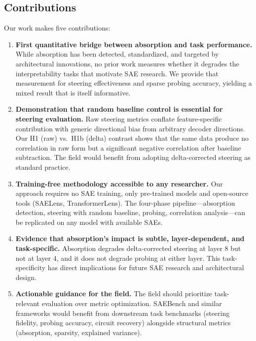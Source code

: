 \documentclass{article}
\begin{document}
\subsection{Contributions}

Our work makes five contributions:

\begin{enumerate}
    \item \textbf{First quantitative bridge between absorption and task performance.} While absorption has been detected, standardized, and targeted by architectural innovations, no prior work measures whether it degrades the interpretability tasks that motivate SAE research. We provide that measurement for steering effectiveness and sparse probing accuracy, yielding a mixed result that is itself informative.

    \item \textbf{Demonstration that random baseline control is essential for steering evaluation.} Raw steering metrics conflate feature-specific contribution with generic directional bias from arbitrary decoder directions. Our H1 (raw) vs.~H1b (delta) contrast shows that the same data produce no correlation in raw form but a significant negative correlation after baseline subtraction. The field would benefit from adopting delta-corrected steering as standard practice.

    \item \textbf{Training-free methodology accessible to any researcher.} Our approach requires no SAE training, only pre-trained models and open-source tools (SAELens, TransformerLens). The four-phase pipeline---absorption detection, steering with random baseline, probing, correlation analysis---can be replicated on any model with available SAEs.

    \item \textbf{Evidence that absorption's impact is subtle, layer-dependent, and task-specific.} Absorption degrades delta-corrected steering at layer 8 but not at layer 4, and it does not degrade probing at either layer. This task-specificity has direct implications for future SAE research and architectural design.

    \item \textbf{Actionable guidance for the field.} The field should prioritize task-relevant evaluation over metric optimization. SAEBench and similar frameworks would benefit from downstream task benchmarks (steering fidelity, probing accuracy, circuit recovery) alongside structural metrics (absorption, sparsity, explained variance).
\end{enumerate}
\end{document}
